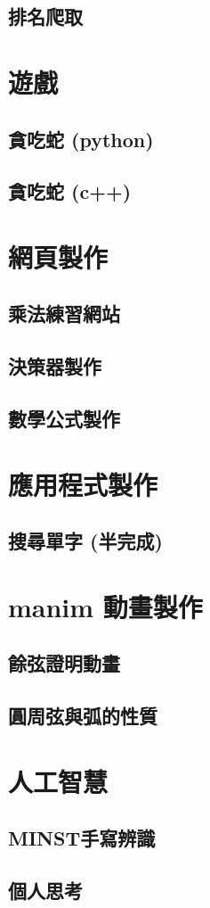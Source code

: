 \documentclass[12pt]{ctexart}
\begin{document}
\subsection{ 排名爬取 }



\clearpage
\section{ 遊戲}
\label{sec::game}
\subsection{ 貪吃蛇 (python) }
\clearpage
\subsection{ 貪吃蛇 (c++) }

\clearpage
\section{ 網頁製作 }
\label{ sec::website }
\subsection{ 乘法練習網站 }
\clearpage
\subsection{ 決策器製作 }
\clearpage
\subsection{ 數學公式製作 }

\clearpage
\section{ 應用程式製作 }
\label{ sec::app }
\subsection{ 搜尋單字 (半完成) }


\clearpage
\section{ manim 動畫製作 }
\label{ sec::animate }
\subsection{ 餘弦證明動畫 }
\clearpage
\subsection{ 圓周弦與弧的性質 }



\clearpage
\section{ 人工智慧 }
\label{ sec::AI }
\subsection{ MINST手寫辨識 }
\clearpage
\subsection{ 個人思考 }
\end{document}
